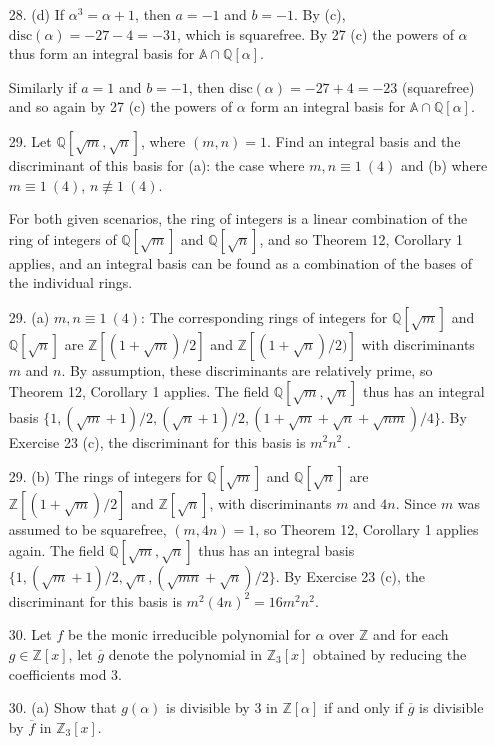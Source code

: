 \documentclass{article}
\newcommand{\Q}[0]{\mathbb{Q}}
\newcommand{\Z}[0]{\mathbb{Z}}
\newcommand{\disc}[1]{\text{disc}(#1)}
\begin{document}
\begin{enumerate}
\item[28. (d)] If $\alpha^3 = \alpha + 1$, then $a = -1$ and $b = -1$.  By (c), $\disc{\alpha} = -27 - 4 = -31$, which is squarefree.  By 27 (c) the powers of $\alpha$ thus form an integral basis for $\mathbb{A} \cap \Q[\alpha]$.

Similarly if $a = 1$ and $b = -1$, then $\disc{\alpha} = -27 + 4 = -23$ (squarefree) and so again by 27 (c) the powers of $\alpha$ form an integral basis for $\mathbb{A} \cap \Q[\alpha]$.

\item[29.] Let $\Q[\sqrt{m}, \sqrt{n}]$, where $(m, n) = 1$.  Find an integral basis and the discriminant of this basis for (a): the case where $m, n \equiv 1\ (4)$ and (b) where $m \equiv 1\ (4)$, $n \not\equiv 1\ (4)$.

For both given scenarios, the ring of integers is a linear combination of the ring of integers of $\Q[\sqrt{m}]$ and $\Q[\sqrt{n}]$, and so Theorem 12, Corollary 1 applies, and an integral basis can be found as a combination of the bases of the individual rings.

\item [29. (a)] $m, n \equiv 1\ (4)$: The corresponding rings of integers for $\Q[\sqrt{m}]$ and $\Q[\sqrt{n}]$ are $\Z[(1 + \sqrt{m})/2]$ and $\Z[(1 + \sqrt{n})/2)]$ with discriminants $m$ and $n$.  By assumption, these discriminants are relatively prime, so Theorem 12, Corollary 1 applies.  The field $\Q[\sqrt{m}, \sqrt{n}]$ thus has an integral basis $\{ 1, (\sqrt{m} + 1)/2, (\sqrt{n} + 1)/2, (1 + \sqrt{m} + \sqrt{n} + \sqrt{nm})/4 \}$.  By Exercise 23 (c), the discriminant for this basis is $m^2 n^2$ .

\item [29. (b)] The rings of integers for $\Q[\sqrt{m}]$ and $\Q[\sqrt{n}]$ are $\Z[(1 +\sqrt{m})/2]$ and $\Z[\sqrt{n}]$, with discriminants $m$ and $4n$.  Since $m$ was assumed to be squarefree, $(m, 4n) = 1$, so Theorem 12, Corollary 1 applies again.  The field $\Q[\sqrt{m}, \sqrt{n}]$ thus has an integral basis $\{ 1, (\sqrt{m} + 1)/2, \sqrt{n}, (\sqrt{mn} + \sqrt{n})/2 \}$.  By Exercise 23 (c), the discriminant for this basis is $m^2 (4n)^2 = 16m^2 n^2$.

\item[30.] Let $f$ be the monic irreducible polynomial for $\alpha$ over $\Z$ and for each $g \in \Z[x]$, let $\overline{g}$ denote the polynomial in $\Z_3[x]$ obtained by reducing the coefficients mod 3.

\item[30. (a)] Show that $g(\alpha)$ is divisible by 3 in $\Z[\alpha]$ if and only if $\overline{g}$ is divisible by $\overline{f}$ in $\Z_3[x]$.


\end{enumerate}
\end{document}
